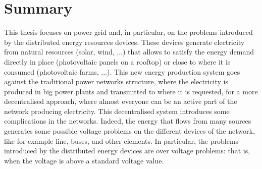 \chapter{Summary}
This thesis focuses on power grid and, in particular, on the problems introduced by the distributed energy resources devices. These devices generate electricity from natural resources (solar, wind, ...) that allows to satisfy the energy demand directly in place (photovoltaic panels on a rooftop) or close to where it is consumed (photovoltaic farms, ...). This new energy production system goes against the traditional power networks structure, where the electricity is produced in big power plants and transmitted to where it is requested, for a more decentralised approach, where almost everyone can be an active part of the network producing electricity. This decentralised system introduces some complications in the networks. Indeed, the energy that flows from many sources generates some possible voltage problems on the different devices of the network, like for example line, buses, and other elements. In particular, the problems introduced by the distributed energy devices are over voltage problems: that is, when the voltage is above a standard voltage value.\\


